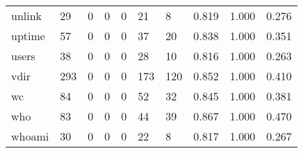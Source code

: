 \begin{longtable}{lp{2.0cm}p{2.0cm}p{2.0cm}p{2.0cm}p{2.0cm}p{2.0cm}p{2.0cm}p{2.0cm}p{2.0cm}}
unlink    &                     29 &                                             0 &                                            0 &                                           0 &                                           21 &                                          8 &                                0.819 &                                  1.000 &                                0.276 \\
uptime    &                     57 &                                             0 &                                            0 &                                           0 &                                           37 &                                         20 &                                0.838 &                                  1.000 &                                0.351 \\
users     &                     38 &                                             0 &                                            0 &                                           0 &                                           28 &                                         10 &                                0.816 &                                  1.000 &                                0.263 \\
vdir      &                    293 &                                             0 &                                            0 &                                           0 &                                          173 &                                        120 &                                0.852 &                                  1.000 &                                0.410 \\
wc        &                     84 &                                             0 &                                            0 &                                           0 &                                           52 &                                         32 &                                0.845 &                                  1.000 &                                0.381 \\
who       &                     83 &                                             0 &                                            0 &                                           0 &                                           44 &                                         39 &                                0.867 &                                  1.000 &                                0.470 \\
whoami    &                     30 &                                             0 &                                            0 &                                           0 &                                           22 &                                          8 &                                0.817 &                                  1.000 &                                0.267 \\

\end{longtable}
